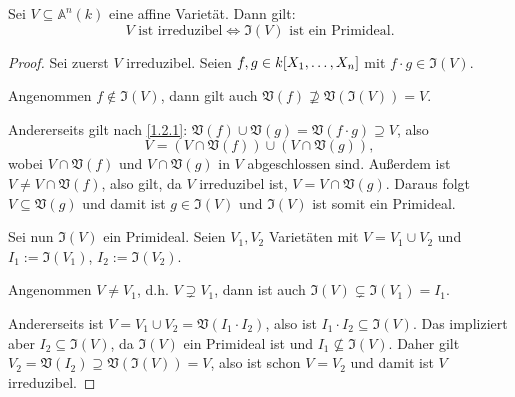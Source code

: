 \documentclass[a4paper,12pt]{scrbook}
\newtheorem{proof}{Beweis}
\def\A{\mathbb{A}}
\def\V{\mathfrak{V}}
\def\I{\mathfrak{I}}
\newcommand{\polyx}[1][n]{\ensuremath%
  [X_{1},\dotsc,X_{#1}]}
\begin{document}
\begin{bem}\label{1.2.9}
Sei $V\subseteq\A^{n}(k)$ eine affine Varietät. Dann gilt:
\[V\text{ ist irreduzibel}\iff\I(V)\text{ ist ein Primideal}.\]
\end{bem}
\begin{proof}
Sei zuerst $V$ irreduzibel. Seien $f,g\in k\polyx$ mit $f\cdot g\in\I(V)$. 

Angenommen $f\notin\I(V)$, dann gilt auch $\V(f)\not\supseteq\V(\I(V))=V$.

Andererseits gilt nach \cref{1.2.1}: $\V(f)\cup\V(g)=\V(f\cdot g)\supseteq V$, also
\[V=(V\cap \V(f))\cup(V\cap\V(g)),\]
wobei $V\cap\V(f)$ und $V\cap\V(g)$ in $V$ abgeschlossen sind. Außerdem ist $V\neq V\cap\V(f)$, also gilt, da $V$ irreduzibel ist, $V=V\cap\V(g)$. Daraus folgt $V\subseteq\V(g)$ und damit ist $g\in\I(V)$ und $\I(V)$ ist somit ein Primideal.

Sei nun $\I(V)$ ein Primideal. Seien $V_{1},V_{2}$ Varietäten mit $V=V_{1}\cup V_{2}$ und $I_{1}:=\I(V_{1})$, $I_{2}:=\I(V_{2})$.

Angenommen $V\neq V_{1}$, d.h. $V\supsetneq V_{1}$, dann ist auch $\I(V)\subsetneq\I(V_{1})=I_{1}$.

Andererseits ist $V=V_{1}\cup V_{2}=\V(I_{1}\cdot I_{2})$, also ist $I_{1}\cdot I_{2}\subseteq\I(V)$. Das impliziert aber $I_{2}\subseteq\I(V)$, da $\I(V)$ ein Primideal ist und $I_{1}\not\subseteq\I(V)$. Daher gilt $V_{2}=\V(I_{2})\supseteq\V(\I(V))=V$, also ist schon $V=V_{2}$ und damit ist $V$ irreduzibel.
\end{proof}
\end{document}
